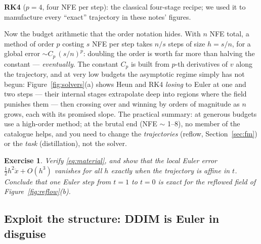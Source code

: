\documentclass[10pt,a4paper]{article}
\newtheorem{exercise}{Exercise}
\begin{document}
\textbf{RK4} ($p = 4$, four NFE per step): the classical four-stage
recipe; we used it to manufacture every ``exact'' trajectory in these
notes' figures.

Now the budget arithmetic that the order notation hides. With $n$ NFE
total, a method of order $p$ costing $s$ NFE per step takes $n/s$ steps
of size $h = s/n$, for a global error $\sim C_p\, (s/n)^p$: doubling the
order is worth far more than halving the constant --- \emph{eventually}.
The constant $C_p$ is built from $p$-th derivatives of $v$ along the
trajectory, and at very low budgets the asymptotic regime simply has not
begun: Figure~\ref{fig:solvers}(a) shows Heun and RK4 \emph{losing} to
Euler at one and two steps --- their internal stages extrapolate deep
into regions where the field punishes them --- then crossing over and
winning by orders of magnitude as $n$ grows, each with its promised
slope. The practical summary: at generous budgets use a high-order
method; at the brutal end (NFE $\sim$ 1--8), no member of the catalogue
helps, and you need to change the \emph{trajectories} (reflow,
Section~\ref{sec:fm}) or the \emph{task} (distillation), not the solver.

\begin{exercise}
\label{ex:euler-exact}
Verify \eqref{eq:material}, and show that the local Euler error
$\tfrac12 h^2 \ddot x + O(h^3)$ vanishes for all $h$ exactly when the
trajectory is affine in $t$. Conclude that one Euler step from $t=1$ to
$t=0$ is exact for the reflowed field of Figure~\ref{fig:reflow}(b).
\end{exercise}

\subsection{Exploit the structure: DDIM is Euler in disguise}
\label{sec:ddim}
\end{document}
